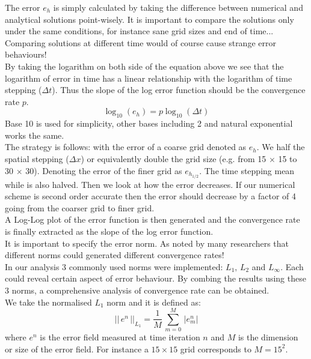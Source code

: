 The error $e_h$ is simply calculated by taking the difference between numerical and analytical solutions point-wisely. It is important to compare the solutions only under the same conditions, for instance sane grid sizes and end of time... Comparing solutions at different time would of course cause strange error behaviours!\\

By taking the logarithm on both side of the equation above we see that the logarithm of error in time has a linear relationship with the logarithm of time stepping ($\Delta t$). Thus the slope of the log error function should be the convergence rate $p$.
\begin{equation}
\log_{10} (e_h) = p\log_{10} (\Delta t)
\end{equation}
Base 10 is used for simplicity, other bases including 2 and natural exponential works the same.\\

The strategy is follows: with the error of a coarse grid denoted as $e_h$. We half the spatial stepping ($\Delta x$) or equivalently double the grid size (e.g. from 15 $\times$ 15 to 30 $\times$ 30). Denoting the error of the finer grid as $e_{h_{1/2}}$. The time stepping mean while is also halved. Then we look at how the error decreases. If our numerical scheme is second order accurate then the error should decrease by a factor of 4 going from the coarser grid to finer grid.\\

A Log-Log plot of the error function is then generated and the convergence rate is finally extracted as the slope of the log error function.\\

It is important to specify the error norm. As noted by many researchers that different norms could generated different convergence rates! \cite{pyo2005normal,guermond2004error}\\
In our analysis 3 commonly used norms were implemented: $L_1,\,L_2$ and $L_\infty$. Each could reveal certain aspect of error behaviour. By combing the results using these 3 norms, a comprehensive analysis of convergence rate can be obtained.\\

We take the normalised $L_1$ norm and it is defined as:
\begin{equation}
||\,e^n\,||_{L_1} = \dfrac{1}{M}\,\sum^M_{m=0}\,|e^n_m|
\end{equation} 
where $e^n$ is the error field measured at time iteration $n$ and $M$ is the dimension or size of the error field. For instance a $15 \times 15$ grid corresponds to $M = 15^2$.\\

